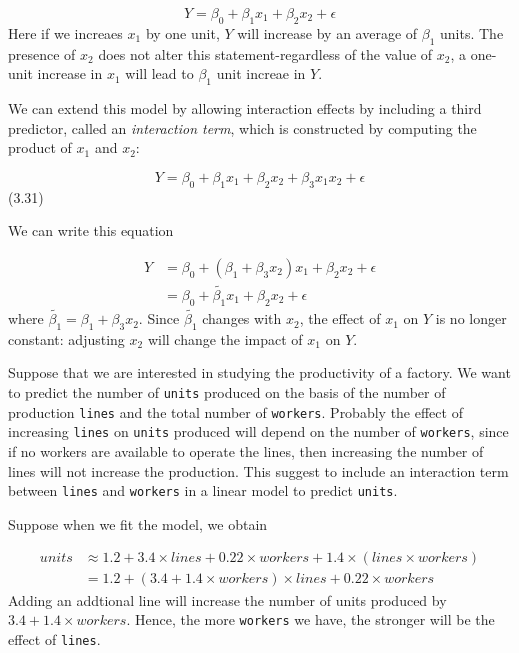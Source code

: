 \documentclass[
  letterpaper,
  DIV=11,
  numbers=noendperiod]{scrreprt}
\begin{document}
\[
Y = \beta_0 + \beta_1x_1 + \beta_2x_2 + \epsilon
\] Here if we increaes \(x_1\) by one unit, \(Y\) will increase by an
average of \(\beta_1\) units. The presence of \(x_2\) does not alter
this statement-regardless of the value of \(x_2\), a one-unit increase
in \(x_1\) will lead to \(\beta_1\) unit increae in \(Y\).

We can extend this model by allowing interaction effects by including a
third predictor, called an \emph{interaction term}, which is constructed
by computing the product of \(x_1\) and \(x_2\):

\[
Y = \beta_0 + \beta_1 x_1 + \beta_2 x_2 + \beta_3 x_1 x_2 + \epsilon
\] (3.31)

We can write this equation

\[
\begin{align}
Y &= \beta_0 + (\beta_1 + \beta_3 x_2)x_1 + \beta_2x_2 +\epsilon \\
&= \beta_0 + \tilde{\beta_1}x_1 + \beta_2x_2 + \epsilon
\end{align}
\] where \(\tilde{\beta_1} = \beta_1 + \beta_3x_2\). Since
\(\tilde{\beta_1}\) changes with \(x_2\), the effect of \(x_1\) on \(Y\)
is no longer constant: adjusting \(x_2\) will change the impact of
\(x_1\) on \(Y\).

\begin{tcolorbox}[enhanced jigsaw, bottomrule=.15mm, colframe=quarto-callout-note-color-frame, toprule=.15mm, coltitle=black, titlerule=0mm, arc=.35mm, bottomtitle=1mm, leftrule=.75mm, colbacktitle=quarto-callout-note-color!10!white, opacitybacktitle=0.6, opacityback=0, title=\textcolor{quarto-callout-note-color}{\faInfo}\hspace{0.5em}{Productivy of a factory}, toptitle=1mm, rightrule=.15mm, left=2mm, breakable, colback=white]

Suppose that we are interested in studying the productivity of a
factory. We want to predict the number of \texttt{units} produced on the
basis of the number of production \texttt{lines} and the total number of
\texttt{workers}. Probably the effect of increasing \texttt{lines} on
\texttt{units} produced will depend on the number of \texttt{workers},
since if no workers are available to operate the lines, then increasing
the number of lines will not increase the production. This suggest to
include an interaction term between \texttt{lines} and \texttt{workers}
in a linear model to predict \texttt{units}.

Suppose when we fit the model, we obtain

\[
\begin{align}
units &\approx 1.2 + 3.4 \times lines + 0.22 \times workers + 1.4 \times (lines \times workers) \\
&= 1.2 + (3.4 + 1.4 \times workers) \times lines + 0.22 \times workers
\end{align}
\] Adding an addtional line will increase the number of units produced
by \(3.4 + 1.4 \times workers\). Hence, the more \texttt{workers} we
have, the stronger will be the effect of \texttt{lines}.

\end{tcolorbox}
\end{document}
